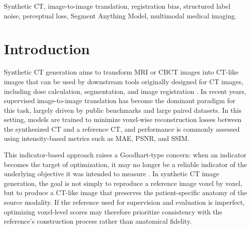 \documentclass[lettersize,journal]{IEEEtran}
\begin{document}
\begin{abstract}
Overall, this study identifies registration-induced bias as a central confounder in supervised synthetic CT generation. Our results argue that
synthetic CT methods should not be evaluated solely through voxel-wise agreement with imperfect reference images, but also through anatomy-oriented criteria that assess whether patient-specific structures are faithfully preserved.
\end{abstract}

\begin{IEEEkeywords}
Synthetic CT, image-to-image translation, registration bias, structured label noise, perceptual loss, Segment Anything Model, multimodal medical imaging.
\end{IEEEkeywords}

\providecommand{\mstd}[3]{\shortstack{#1$^{#3}$\\[0.4ex]{\scriptsize$\pm$#2}}}
\providecommand{\bmstd}[3]{\shortstack{\textbf{#1}$^{#3}$\\[0.4ex]{\scriptsize\textbf{$\pm$#2}}}}

\section{Introduction}

Synthetic CT generation aims to transform MRI or CBCT images into CT-like images that can be used by downstream tools originally designed for CT images, including dose calculation, segmentation, and image registration \cite{edmund2017review,dayarathna2024deep}. In recent years, supervised image-to-image translation has become the dominant paradigm for this task, largely driven by public benchmarks and large paired datasets. In this setting, models are trained to minimize voxel-wise reconstruction losses between the synthesized CT and a reference CT, and performance is commonly assessed using intensity-based metrics such as MAE, PSNR, and SSIM.

This indicator-based approach raises a Goodhart-type concern: when an indicator becomes the target of optimization, it may no longer be a reliable indicator of the underlying objective it was intended to measure \cite{goodhart1975problems}. In synthetic CT image generation, the goal is not simply to reproduce a reference image voxel by voxel, but to produce a CT-like image that preserves the patient-specific anatomy of the source modality. If the reference used for supervision and evaluation is imperfect, optimizing voxel-level scores may therefore prioritize consistency with the reference’s construction process rather than anatomical fidelity.
\end{document}
